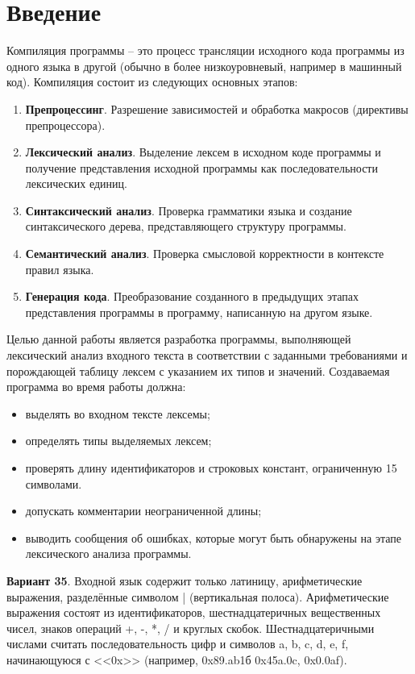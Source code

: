 \documentclass[a4paper,final]{article}
\begin{document}
\section*{Введение}
Компиляция программы -- это процесс трансляции исходного кода программы из одного языка в другой (обычно в более низкоуровневый, например в машинный код). Компиляция состоит из следующих основных этапов:
\begin{enumerate}
    \item \textbf{Препроцессинг}. Разрешение зависимостей и обработка макросов (директивы препроцессора).
    \item \textbf{Лексический анализ}. Выделение лексем в исходном коде программы и получение представления исходной программы как последовательности лексических единиц.
    \item \textbf{Синтаксический анализ}. Проверка грамматики языка и создание синтаксического дерева, представляющего структуру программы.
    \item \textbf{Семантический анализ}. Проверка смысловой корректности в контексте правил языка.
    \item \textbf{Генерация кода}. Преобразование созданного в предыдущих этапах представления программы в программу, написанную на другом языке. 
\end{enumerate}

Целью данной работы является разработка программы, выполняющей лексический анализ входного текста в соответствии с заданными требованиями и порождающей таблицу лексем с указанием их типов и значений. Создаваемая программа во время работы должна:
\begin{itemize}
    \item выделять во входном тексте лексемы;
    \item определять типы выделяемых лексем;
    \item проверять длину идентификаторов и строковых констант, ограниченную 15 символами.
    \item допускать комментарии неограниченной длины;
    \item выводить сообщения об ошибках, которые могут быть обнаружены на этапе лексического анализа программы.
\end{itemize}

\textbf{Вариант 35}. Входной язык содержит только латиницу, арифметические выражения, разделённые символом | (вертикальная полоса). Арифметические выражения состоят из идентификаторов, шестнадцатеричных вещественных чисел, знаков операций +, -, *, / и круглых скобок. Шестнадцатеричными числами считать последовательность цифр и символов a, b, c, d, e, f, начинающуюся с <<0x>> (например, 0x89.ab1б 0x45a.0c, 0x0.0af).
\end{document}

